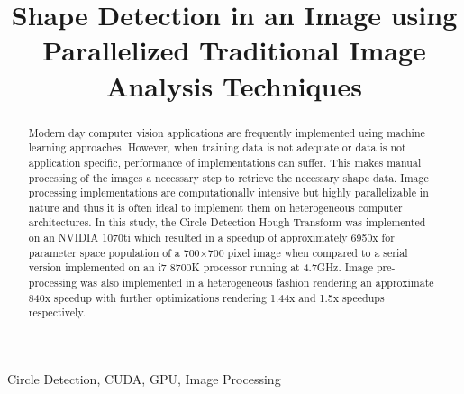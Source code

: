 \documentclass[conference]{IEEEtran}
\begin{document}
\title{Shape Detection in an Image using Parallelized Traditional Image Analysis Techniques\\
}

\author{
\and
}

\maketitle


\begin{IEEEkeywords}
  Circle Detection, CUDA, GPU, Image Processing
\end{IEEEkeywords}

\begin{abstract}
Modern day computer vision applications are frequently implemented using machine learning approaches.
However, when training data is not adequate or data is not application specific, performance of implementations can suffer.
This makes manual processing of the images a necessary step to retrieve the necessary shape data.
Image processing implementations are computationally intensive but highly parallelizable in nature and thus it is often ideal to implement them on heterogeneous computer architectures.
In this study, the Circle Detection Hough Transform was implemented on an NVIDIA 1070ti which resulted in a speedup of approximately 6950x for parameter space population of a 700$\times$700 pixel image when compared to a serial version implemented on an i7 8700K processor running at 4.7GHz.
Image pre-processing was also implemented in a heterogeneous fashion rendering an approximate 840x speedup with further optimizations rendering 1.44x and 1.5x speedups respectively. 

\end{abstract}
\end{document}
